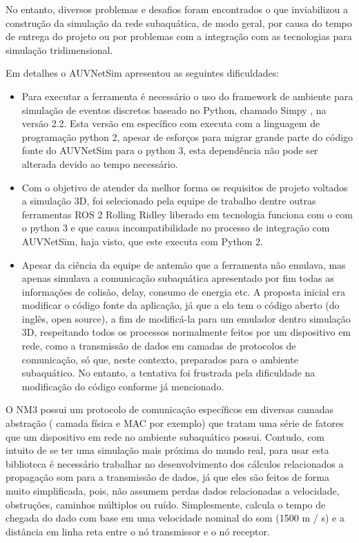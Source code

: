 No entanto, diversos problemas e desafios foram encontrados o que inviabilizou a construção da simulação da rede subaquática, de modo geral, por causa do tempo de entrega do projeto ou por problemas com a integração com as tecnologias para simulação tridimensional. 

Em detalhes o AUVNetSim apresentou as seguintes dificuldades:

\begin{itemize}
	\item Para executar a ferramenta é necessário o uso do framework de ambiente para simulação de eventos discretos baseado no Python, chamado Simpy \cite{montana2008auvnetsim}, na versão 2.2. Esta versão em específico com executa com a linguagem de programação python 2, apesar de esforços para migrar grande parte do código fonte do AUVNetSim para o python 3, esta dependência não pode ser alterada devido ao tempo necessário.
	\item Com o objetivo de atender da melhor forma os requisitos de projeto voltados a simulação 3D, foi selecionado pela equipe de trabalho dentre outras ferramentas ROS 2 Rolling Ridley liberado em tecnologia funciona com o com o python 3 e que causa incompatibilidade no processo de integração com AUVNetSim, haja visto, que este executa com Python 2.
	\item Apesar da ciência da equipe de antemão que a ferramenta não emulava, mas apenas simulava a comunicação subaquática apresentado por fim todas as informações de colisão, delay, consumo de energia etc. A proposta inicial era modificar o código fonte da aplicação, já que a ela tem o código aberto (do inglês, open source), a fim de modificá-la para um emulador dentro simulação 3D, respeitando todos os processos normalmente feitos por um dispositivo em rede, como a transmissão de dados em camadas de protocolos de comunicação, só que, neste contexto, preparados para o ambiente subaquático. No entanto, a tentativa foi frustrada pela dificuldade na modificação do código conforme já mencionado.
\end{itemize}

O NM3 possui um protocolo de comunicação específicos em diversas camadas abstração (  camada física e MAC por exemplo) que tratam uma série de fatores que um dispositivo em rede no ambiente subaquático possui. Contudo, com intuito de se ter uma simulação mais próxima do mundo real, para usar esta biblioteca é necessário trabalhar no desenvolvimento dos cálculos relacionados a propagação som para a transmissão de dados, já que eles são feitos de forma muito simplificada, pois, não assumem perdas dados relacionadas a velocidade, obstruções, caminhos múltiplos ou ruído. Simplesmente, calcula o tempo de chegada do dado com base em uma velocidade nominal do som (1500 m / s) e a distância em linha reta entre o nó transmissor e o nó receptor. 

